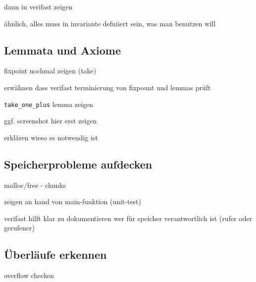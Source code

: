 dann in verifast zeigen

ähnlich, alles muss in invariante defniiert sein, was man benutzen will

\subsection{Lemmata und Axiome}

fixpoint nochmal zeigen (take)

erwähnen dass verifast terminierung von fixpount und lemmas prüft

\lstinline{take_one_plus} lemma zeigen

ggf. screenshot hier erst zeigen

erklären wieso es notwendig ist

\subsection{Speicherprobleme aufdecken}

malloc/free - chunks

zeigen an hand von main-funktion (unit-test)

verifast hilft klar zu dokumentieren wer für speicher verantwortlich ist (rufer oder gerufener)

\subsection{Überläufe erkennen}

overflow checken
